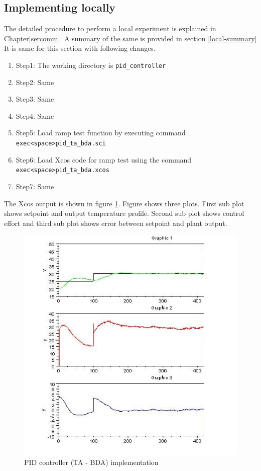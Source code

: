 \subsection{Implementing locally}
The detailed procedure to perform a local experiment is explained in Chapter\ref{sercomm}. A summary of the same is provided in section \ref{local-summary} It is same for this section with following changes.

\begin{enumerate}
\item Step1: The working directory is {\tt  pid\_controller}
\item Step2: Same
\item Step3: Same
\item Step4: Same
\item Step5: Load ramp test function by executing command\\ {\tt exec<space>pid\_ta\_bda.sci}
\item Step6: Load Xcos code for ramp test using the command\\ {\tt exec<space>pid\_ta\_bda.xcos}
\item Step7: Same
\end{enumerate}


The Xcos output is shown in figure \ref{pid_ta_bda}.
Figure shows three plots. First sub plot shows setpoint and output temperature profile. Second sub plot shows control 
effort and third sub plot shows error between setpoint and plant output.

\begin{figure}
\centering
\includegraphics[width=0.6\linewidth]{pid_manual/pid_ta_bda_graph.jpg}
\caption{PID controller (TA - BDA) implementation}
\label{pid_ta_bda}
\end{figure}
 
